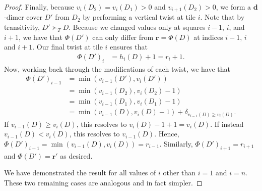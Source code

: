\documentclass[10pt,a4paper]{amsart}
\def\bfd{{\mathbf{d}}}
\def\bfr{{\mathbf{r}}}
\begin{document}
\begin{proof}
Finally, because $v_i(D_2)=v_i(D_1)>0$ and $v_{i+1}(D_2)>0$, we form a $\bfd$-dimer cover $D'$ from $D_2$ by performing a vertical twist at tile $i$. Note that by transitivity, $D'\succ_T D$.
Because we changed values only at squares $i-1$, $i$, and $i+1$, we have that $\Phi(D')$ can only differ from $\bfr=\Phi(D)$ at indices $i-1$, $i$ and $i+1$. Our final twist at tile $i$ ensures that 
\begin{align*}
    \Phi(D')_i&=h_i(D)+1=r_i+1.
\end{align*}
Now, working back through the modifications of each twist, we have that
\begin{align*}
    \Phi(D')_{i-1}&=\min(v_{i-1}(D'),v_{i}(D'))\\
    &=\min(v_{i-1}(D_2),v_i(D_2)-1)\\
    &=\min(v_{i-1}(D_1),v_i(D_1)-1)\\
    &=\min(v_{i-1}(D),v_i(D)-1)+\delta_{v_{i-1}(D)\geq v_i(D)}.
\end{align*}
If $v_{i-1}(D)\geq v_i(D)$, this resolves to $v_{i}(D)-1+1=v_{i}(D)$.
If instead $v_{i-1}(D)< v_i(D)$, this resolves to $v_{i-1}(D)$. Hence, $\Phi(D')_{i-1}=\min(v_{i-1}(D),v_i(D))=r_{i-1}$. Similarly, $\Phi(D')_{i+1}=r_{i+1}$ and $\Phi(D')=\bfr'$ as desired.

We have demonstrated the result for all values of $i$ other than $i=1$ and $i=n$. These two remaining cases are analogous and in fact simpler. \qedhere

\end{proof}
\end{document}
